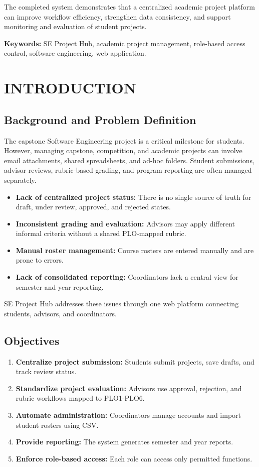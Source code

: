 \documentclass[12pt,a4paper]{report}
\newcommand{\tightlist}{\setlist{nosep,leftmargin=17mm}}
\begin{document}
The completed system demonstrates that a centralized academic project platform can improve workflow efficiency, strengthen data consistency, and support monitoring and evaluation of student projects.\par\textbf{Keywords:} SE Project Hub, academic project management, role-based access control, software engineering, web application.

\clearpage\tableofcontents\clearpage\listoftables\clearpage\listoffigures

\clearpage\chapter{INTRODUCTION}
\section{Background and Problem Definition}
The capstone Software Engineering project is a critical milestone for students. However, managing capstone, competition, and academic projects can involve email attachments, shared spreadsheets, and ad-hoc folders. Student submissions, advisor reviews, rubric-based grading, and program reporting are often managed separately.
\begin{itemize}\tightlist
\item \textbf{Lack of centralized project status:} There is no single source of truth for draft, under review, approved, and rejected states.
\item \textbf{Inconsistent grading and evaluation:} Advisors may apply different informal criteria without a shared PLO-mapped rubric.
\item \textbf{Manual roster management:} Course rosters are entered manually and are prone to errors.
\item \textbf{Lack of consolidated reporting:} Coordinators lack a central view for semester and year reporting.
\end{itemize}
SE Project Hub addresses these issues through one web platform connecting students, advisors, and coordinators.
\section{Objectives}
\begin{enumerate}[leftmargin=15mm]
\item \textbf{Centralize project submission:} Students submit projects, save drafts, and track review status.
\item \textbf{Standardize project evaluation:} Advisors use approval, rejection, and rubric workflows mapped to PLO1-PLO6.
\item \textbf{Automate administration:} Coordinators manage accounts and import student rosters using CSV.
\item \textbf{Provide reporting:} The system generates semester and year reports.
\item \textbf{Enforce role-based access:} Each role can access only permitted functions.
\end{enumerate}
\end{document}
